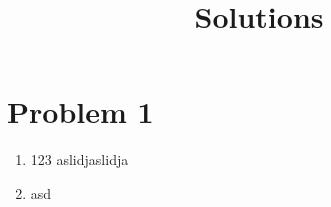 \documentclass{article}
\begin{document}


\section*{Problem 1}
\title{Solutions}
\begin{enumerate}
        \item 123
aslidjaslidja
        \item asd

\end{enumerate}
\end{document}

